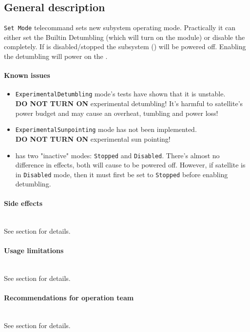 

\subsection{General description}
\texttt{Set \Adcs Mode} telecommand sets new \Adcs subystem operating mode. Practically it can either set 
the Builtin Detumbling (which will turn on the \Imtq module) or disable the \Adcs completely. If \Adcs is 
disabled/stopped the \Adcs subsystem (\Imtq) will be powered off. Enabling the detumbling will power on the \Imtq.

\paragraph{Known issues}
\begin{itemize}
    \item \danger \texttt{ExperimentalDetumbling} mode's tests have shown that it is unstable. \\
    \textbf{DO NOT TURN ON} experimental detumbling! It's harmful to satellite's power budget and may cause an overheat, tumbling and power loss! 
    \item \danger \texttt{ExperimentalSunpointing} mode has not been implemented.  \\
    \textbf{DO NOT TURN ON} \Adcs experimental sun pointing!
    \item \warn \Adcs has two "inactive" modes: \texttt{Stopped} and \texttt{Disabled}. There's almost no difference in effects, both will cause \Imtq to be powered off. However, if satellite is in \texttt{Disabled} mode, then it must first be set to \texttt{Stopped} before enabling detumbling.
\end{itemize}

\paragraph{Side effects} \mbox{} \\
See  section for details.

\paragraph{Usage limitations} \mbox{} \\
See  section for details.

\paragraph{Recommendations for operation team} \mbox{} \\
See  section for details.

